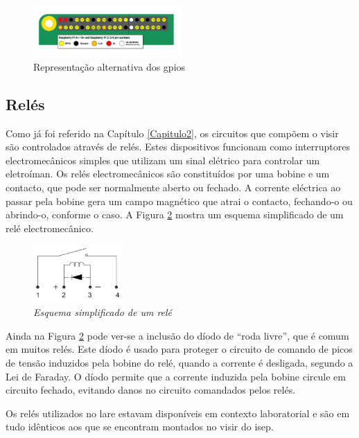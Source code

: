 \begin{figure}[hbtp]
    \centering
    \includegraphics[width=0.5\textwidth]{figures/GPIO.png}
    \caption{Representação alternativa dos \acrshort{gpio}s \cite{Raspberrytech}}
    \label{fig:gpiocores}
\end{figure}

\subsection{Relés}
\label{sec:reles}
Como já foi referido na Capítulo \ref{Capitulo2}, os circuitos que compõem o \acrshort{visir} são controlados através de relés. Estes dispositivos funcionam como interruptores electromecânicos simples que utilizam um sinal elétrico para controlar um eletroíman.
Os relés electromecânicos são constituídos por uma bobine e um contacto, que pode ser normalmente aberto ou fechado. A corrente eléctrica ao passar pela bobine gera um campo magnético que atrai o contacto, fechando-o ou abrindo-o, conforme o caso. A Figura \ref{fig:esquematicoreles} mostra um esquema simplificado de um relé electromecânico.

\begin{figure}[hbtp]
    \centering
    \includegraphics[width=0.3\textwidth]{figures/esquematico_rele.png}
    \caption{\textit{Esquema simplificado de um relé \cite{DryRelay}}}
    \label{fig:esquematicoreles}
\end{figure}

Ainda na Figura \ref{fig:esquematicoreles} pode ver-se a inclusão do díodo de ``roda livre'', que é comum em muitos relés. Este díodo é usado para proteger o circuito de comando de picos de tensão induzidos pela bobine do relé, quando a corrente é desligada, segundo a Lei de Faraday. O díodo permite que a corrente induzida pela bobine circule em circuito fechado, evitando danos no circuito comandados pelos relés.

Os relés utilizados no \acrshort{lare} estavam disponíveis em contexto laboratorial e são em tudo idênticos aos que se encontram montados no \acrshort{visir}  do \acrshort{isep}.

